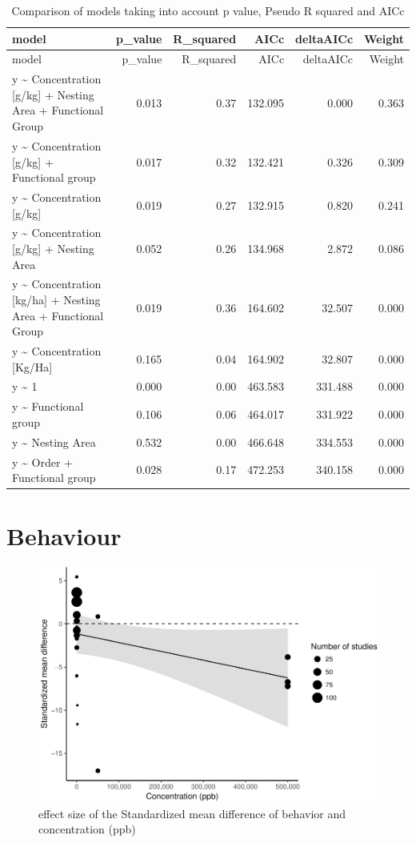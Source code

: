 \documentclass[]{elsarticle} %
\makeatletter
\def\maxwidth{\ifdim\Gin@nat@width>\linewidth\linewidth
\else\Gin@nat@width\fi}
\let\Oldincludegraphics\includegraphics
\renewcommand{\includegraphics}[1]{\Oldincludegraphics[width=\maxwidth]{#1}}
\makeatother
\begin{document}
\begin{longtable}[c]{@{}lrrrrr@{}}
\caption{Comparison of models taking into account p value, Pseudo R
squared and AICc}\tabularnewline
\toprule
model & p\_value & R\_squared & AICc & deltaAICc & Weight\tabularnewline
\midrule
\endfirsthead
\toprule
model & p\_value & R\_squared & AICc & deltaAICc & Weight\tabularnewline
\midrule
\endhead
y \textasciitilde{} Concentration {[}g/kg{]} + Nesting Area + Functional
Group & 0.013 & 0.37 & 132.095 & 0.000 & 0.363\tabularnewline
y \textasciitilde{} Concentration {[}g/kg{]} + Functional group & 0.017
& 0.32 & 132.421 & 0.326 & 0.309\tabularnewline
y \textasciitilde{} Concentration {[}g/kg{]} & 0.019 & 0.27 & 132.915 &
0.820 & 0.241\tabularnewline
y \textasciitilde{} Concentration {[}g/kg{]} + Nesting Area & 0.052 &
0.26 & 134.968 & 2.872 & 0.086\tabularnewline
y \textasciitilde{} Concentration {[}kg/ha{]} + Nesting Area +
Functional Group & 0.019 & 0.36 & 164.602 & 32.507 &
0.000\tabularnewline
y \textasciitilde{} Concentration {[}Kg/Ha{]} & 0.165 & 0.04 & 164.902 &
32.807 & 0.000\tabularnewline
y \textasciitilde{} 1 & 0.000 & 0.00 & 463.583 & 331.488 &
0.000\tabularnewline
y \textasciitilde{} Functional group & 0.106 & 0.06 & 464.017 & 331.922
& 0.000\tabularnewline
y \textasciitilde{} Nesting Area & 0.532 & 0.00 & 466.648 & 334.553 &
0.000\tabularnewline
y \textasciitilde{} Order + Functional group & 0.028 & 0.17 & 472.253 &
340.158 & 0.000\tabularnewline
\bottomrule
\end{longtable}

\section{Behaviour}\label{behaviour}

\begin{figure}[htbp]
\centering
\includegraphics{MetanalysisNeonics_files/figure-latex/unnamed-chunk-18-1.pdf}
\caption{effect size of the Standardized mean difference of behavior and
concentration (ppb)}
\end{figure}
\end{document}
